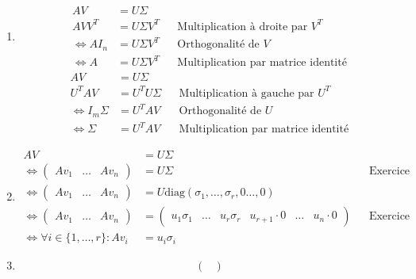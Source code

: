 \documentclass[12pt]{article}
\begin{document}
\begin{enumerate}
    \item 
    \begin{align*}
        AV & = U \Sigma && \\
        AVV^T & = U \Sigma V^T && \text{Multiplication à droite par $V^T$}\\
        \Leftrightarrow AI_n & = U \Sigma V^T && \text{Orthogonalité de $V$} \\
        \Leftrightarrow A & = U \Sigma V^T && \text{Multiplication par matrice identité}
    \end{align*}
    \begin{align*}
        AV & = U \Sigma && \\
        U^T A V & = U^T U \Sigma && \text{Multiplication à gauche par $U^T$} \\
        \Leftrightarrow I_m \Sigma &= U^T A V && \text{Orthogonalité de $U$} \\
        \Leftrightarrow \Sigma & = U^T A V && \text{Multiplication par matrice identité}
    \end{align*}
    \item 
    \begin{align*}
        AV &= U \Sigma && \\
        \Leftrightarrow \begin{pmatrix}
            Av_1 & \dots & Av_n 
        \end{pmatrix} & = U \Sigma && \text{Exercice 7.2a} \\
        \Leftrightarrow \begin{pmatrix}
            Av_1 & \dots & Av_n 
        \end{pmatrix} & = U \text{diag}(\sigma_1, \dotsc, \sigma_r, 0 \dotsc, 0) && \\
        \Leftrightarrow \begin{pmatrix}
            Av_1 & \dots & Av_n 
        \end{pmatrix} & = \begin{pmatrix}
            u_1 \sigma_1 & \dots & u_r \sigma_r & u_{r+1} \cdot 0 & \dots & u_n \cdot 0
        \end{pmatrix} && \text{Exercice 8.1} \\
        \Leftrightarrow \forall i \in \{1, \dotsc, r\}: Av_i & = u_i \sigma_i  
    \end{align*}
    \item 
    \begin{align*}
        \begin{pmatrix}

\end{pmatrix}
\end{align*}
\end{enumerate}
\end{document}
